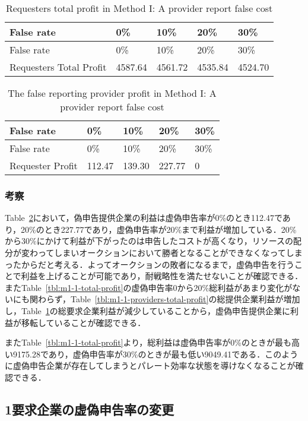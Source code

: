 \hypertarget{tbl:m1-1-requesters-total-profit}{}
\begin{longtable}[H]{@{}lllll@{}}
\caption{\label{tbl:m1-1-requesters-total-profit}Requesters total profit
in Method I: A provider report false cost}\tabularnewline
\toprule
False rate & 0\% & 10\% & 20\% & 30\%\tabularnewline
\midrule
\endfirsthead
\toprule
False rate & 0\% & 10\% & 20\% & 30\%\tabularnewline
\midrule
\endhead
Requesters Total Profit & 4587.64 & 4561.72 & 4535.84 &
4524.70\tabularnewline
\bottomrule
\end{longtable}

\hypertarget{tbl:m1-1-false-requester-total-profit}{}
\begin{longtable}[H]{@{}lllll@{}}
\caption{\label{tbl:m1-1-false-requester-total-profit}The false
reporting provider profit in Method I: A provider report false
cost}\tabularnewline
\toprule
False rate & 0\% & 10\% & 20\% & 30\%\tabularnewline
\midrule
\endfirsthead
\toprule
False rate & 0\% & 10\% & 20\% & 30\%\tabularnewline
\midrule
\endhead
Requester Profit & 112.47 & 139.30 & 227.77 & 0\tabularnewline
\bottomrule
\end{longtable}

\hypertarget{ux8003ux5bdf}{%
\subsubsection{考察}\label{ux8003ux5bdf}}

Table~\ref{tbl:m1-1-false-requester-total-profit}において，偽申告提供企業の利益は虚偽申告率が0\%のとき112.47であり，20\%のとき227.77であり，虚偽申告率が20\%まで利益が増加している．20\%から30\%にかけて利益が下がったのは申告したコストが高くなり，リソースの配分が変わってしまいオークションにおいて勝者となることができなくなってしまったからだと考える．よってオークションの敗者になるまで，虚偽申告を行うことで利益を上げることが可能であり，耐戦略性を満たせないことが確認できる．またTable~\ref{tbl:m1-1-total-profit}の虚偽申告率0から20\%総利益があまり変化がないにも関わらず，Table~\ref{tbl:m1-1-providers-total-profit}の総提供企業利益が増加し，Table~\ref{tbl:m1-1-requesters-total-profit}の総要求企業利益が減少していることから，虚偽申告提供企業に利益が移転していることが確認できる．

またTable~\ref{tbl:m1-1-total-profit}より，総利益は虚偽申告率が0\%のときが最も高い9175.28であり，虚偽申告率が30\%のときが最も低い9049.41である．このように虚偽申告企業が存在してしまうとパレート効率な状態を導けなくなることが確認できる．

\hypertarget{ux8981ux6c42ux4f01ux696dux306eux865aux507dux7533ux544aux7387ux306eux5909ux66f4}{%
\subsection{1要求企業の虚偽申告率の変更}\label{ux8981ux6c42ux4f01ux696dux306eux865aux507dux7533ux544aux7387ux306eux5909ux66f4}}

